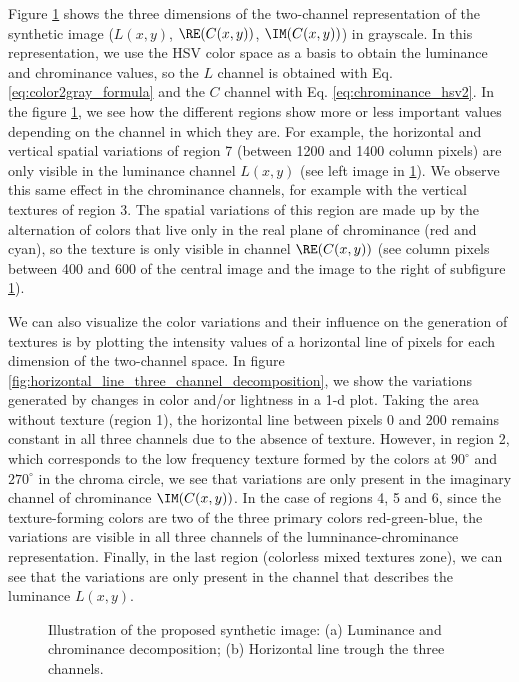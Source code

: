 Figure \ref{fig:three_channel_decomposition} shows the three dimensions of the two-channel representation of the synthetic image ($L(x,y)$, $\RE(C(x,y))$, $\IM(C(x,y))$) in grayscale. In this representation, we use the HSV color space as a basis to obtain the luminance and chrominance values, so the $L$ channel is obtained with Eq. \eqref{eq:color2gray_formula} and the $C$ channel with Eq. \eqref{eq:chrominance_hsv2}. In the figure \ref{fig:three_channel_decomposition}, we see how the different regions show more or less important values depending on the channel in which they are. For example, the horizontal and vertical spatial variations of region 7 (between 1200 and 1400 column pixels) are only visible in the luminance channel $L(x,y)$ (see left image in \ref{fig:three_channel_decomposition}). We observe this same effect in the chrominance channels, for example with the vertical textures of region 3. The spatial variations of this region are made up by the alternation of colors that live only in the real plane of chrominance (red and cyan), so the texture is only visible in channel $\RE(C(x,y))$ (see column pixels between 400 and 600 of the central image and the image to the right of subfigure \ref{fig:three_channel_decomposition}). 

We can also visualize the color variations and their influence on the generation of textures is by plotting the intensity values of a horizontal line of pixels for each dimension of the two-channel space. In figure \ref{fig:horizontal_line_three_channel_decomposition}, we show the variations generated by changes in color and/or lightness in a 1-d plot. Taking the area without texture (region 1), the horizontal line between pixels 0 and 200 remains constant in all three channels due to the absence of texture. However, in region 2, which corresponds to the low frequency texture formed by the colors at $90^\circ$ and $270^\circ$ in the chroma circle, we see that variations are only present in the imaginary channel of chrominance $\IM(C(x,y))$. In the case of regions 4, 5 and 6, since the texture-forming colors are two of the three primary colors red-green-blue, the variations are visible in all three channels of the lumninance-chrominance representation. Finally, in the last region (colorless mixed textures zone), we can see that the variations are only present in the channel that describes the luminance $L(x,y)$.

\begin{figure}[!ht]
\centering
\caption{Illustration of the proposed synthetic image: (a) Luminance and chrominance decomposition; (b) Horizontal line trough the three channels.}\label{fig:three_channel_decomposition}
\end{figure}


